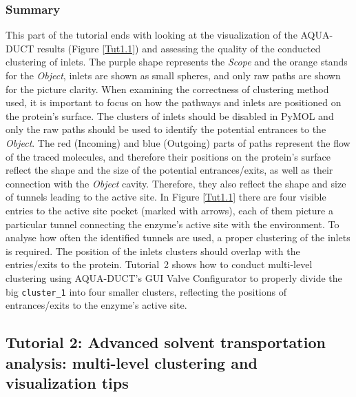 \documentclass[9pt,tutorial]{livecoms}
\begin{document}
\subsubsection{Summary}
This part of the tutorial ends with looking at the visualization of the AQUA-DUCT results (Figure \ref{Tut1.1}) and assessing the quality of the conducted clustering of inlets. The purple shape represents the \emph{Scope} and the orange stands for the \emph{Object}, inlets are shown as small spheres, and only raw paths are shown for the picture clarity. When examining the correctness of clustering method used, it is important to focus on how the pathways and inlets are positioned on the protein's surface. The clusters of inlets should be disabled in PyMOL and only the raw paths should be used to identify the potential entrances to the \textit{Object}. The red (Incoming) and blue (Outgoing) parts of paths represent the flow of the traced molecules, and therefore their positions on the protein's surface reflect the shape and the size of the potential entrances/exits, as well as their connection with the \textit{Object} cavity. Therefore, they also reflect the shape and size of tunnels leading to the active site. In Figure \ref{Tut1.1} there are four visible entries to the active site pocket (marked with arrows), each of them picture a particular tunnel connecting the enzyme's active site with the environment. To analyse how often the identified tunnels are used, a proper clustering of the inlets is required. The position of the inlets clusters should overlap with the entries/exits to the protein. Tutorial~2 shows how to conduct multi-level clustering using AQUA-DUCT's GUI Valve Configurator to properly divide the big \texttt{cluster\_1} into four smaller clusters, reflecting the positions of entrances/exits to the enzyme's active site.

\subsection{Tutorial 2: Advanced solvent transportation analysis: multi-level clustering and visualization tips}
\end{document}
